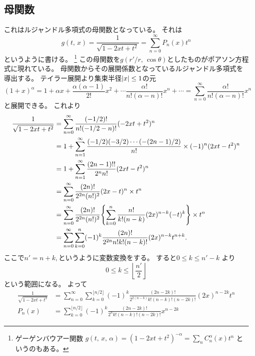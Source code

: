 \documentclass[../master.tex]{subfiles}
\begin{document}
\subsection{母関数}
これはルジャンドル多項式の母関数となっている。
それは
\begin{equation}
	g(t,\,x) = \frac{1}{\sqrt{1-2xt+t^2}} = \sum_{n=0}^{\infty}P_n(x)t^n
\end{equation}
というように書ける。
\footnote{
ゲーゲンバウアー関数
\(g(t,\,x,\,\alpha) = (1-2xt+t^2)^{-\alpha}=\sum_n C_n^{\alpha}(x)t^n\)
というのもある。
}
この母関数を\(g(r'/r,\,\cos\theta)\)としたものがポアソン方程式に現れている。
母関数からその展開係数となっているルジャンドル多項式を導出する。
テイラー展開より集束半径\(\abs{x}\leq1\)の元
\begin{equation}
	(1+x)^\alpha = 1 + \alpha x + \frac{\alpha(\alpha-1)}{2!}x^2+\cdots\frac{\alpha !}{n! (\alpha-n)!}x^n + \cdots
	= \sum_{n=0}^{\infty} \frac{\alpha !}{n! (\alpha-n)!}x^n
\end{equation}
と展開できる。
これより
\begin{equation}\begin{aligned}[b]
    \frac{1}{\sqrt{1-2xt+t^2}} & = \sum_{n=0}^{\infty} \frac{(-1/2)!}{n!(-1/2-n)!}(-2xt+t^2)^n                                                     \\
	                           & = 1+\sum_{n=1}^{\infty} \frac{(-1/2)(-3/2)\cdots(-(2n-1)/2)}{n!}\times(-1)^n(2xt-t^2)^n                           \\
	                           & = 1+\sum_{n=1}^{\infty} \frac{(2n-1)!!}{2^n n!}(2xt-t^2)^n                                                        \\
	                           & = \sum_{n=0}^{\infty} \frac{(2n)!}{2^{2n}(n!)^2}(2x-t)^n \times t^n                                               \\
	                           & = \sum_{n=0}^{\infty} \frac{(2n)!}{2^{2n}(n!)^2}\qty{\sum_{k=0}^{n}\frac{n!}{k!(n-k)}(2x)^{n-k}(-t)^k} \times t^n \\
	                           & = \sum_{n=0}^{\infty}\sum_{k=0}^{n}(-1)^k \frac{(2n)!}{2^{2n}n!k!(n-k)!}(2x)^{n-k}t^{n+k}.
\end{aligned}\end{equation}
ここで\(n' = n+k,\)というように変数変換をする。
すると\(0 \leq k \leq n' -k\) より
\begin{equation}
	0 \leq k \leq \left\lfloor \frac{n'}{2} \right\rfloor
\end{equation}
という範囲になる。
よって
\begin{align}
	\frac{1}{\sqrt{1-2xt+t^2}}
	       & = \sum_{n=0}^{\infty}\sum_{k=0}^{\lfloor n/2 \rfloor}(-1)^k \frac{(2n-2k)!}{2^{2(n-k)}k!(n-k)!(n-2k)!}(2x)^{n-2k}t^{n} \\
	P_n(x) & = \sum_{k=0}^{\lfloor n/2 \rfloor}(-1)^k \frac{(2n-2k)!}{2^n k!(n-k)!(n-2k)!}x^{n-2k}
\end{align}
\end{document}
